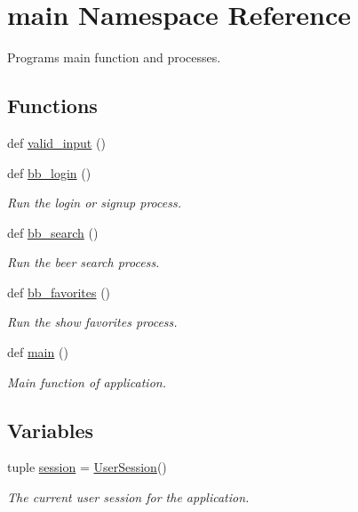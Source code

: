 \hypertarget{namespacemain}{}\section{main Namespace Reference}
\label{namespacemain}


Programs main function and processes.  


\subsection*{Functions}
\begin{DoxyCompactItemize}
\item 
def \hyperlink{namespacemain_a5ff7c4d1cdbb0d99574828e68d8689ae}{valid\+\_\+input} ()
\item 
def \hyperlink{namespacemain_a99f8d63f639b46856eb73f8cefa96491}{bb\+\_\+login} ()
\begin{DoxyCompactList}\small\item\em Run the login or signup process. \end{DoxyCompactList}\item 
def \hyperlink{namespacemain_a29413ffff2053a142a7fbecb1cd76f8d}{bb\+\_\+search} ()
\begin{DoxyCompactList}\small\item\em Run the beer search process. \end{DoxyCompactList}\item 
def \hyperlink{namespacemain_a930fb7adafdf123e6021492948c65fb4}{bb\+\_\+favorites} ()
\begin{DoxyCompactList}\small\item\em Run the show favorites process. \end{DoxyCompactList}\item 
def \hyperlink{namespacemain_af613cea4cba4fb7de8e40896b3368945}{main} ()
\begin{DoxyCompactList}\small\item\em Main function of application. \end{DoxyCompactList}\end{DoxyCompactItemize}
\subsection*{Variables}
\begin{DoxyCompactItemize}
\item 
tuple \hyperlink{namespacemain_a98baefdfc770c3f0d025c5a669572c93}{session} = \hyperlink{classdb__comms_1_1comms_1_1_user_session}{User\+Session}()
\begin{DoxyCompactList}\small\item\em The current user session for the application. \end{DoxyCompactList}\end{DoxyCompactItemize}


